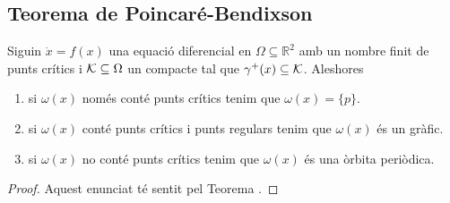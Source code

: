 \documentclass[../Apunts.tex]{subfiles}
\begin{document}
	\subsection{Teorema de Poincaré-Bendixson}
	\begin{definition}[Gràfic]
		\label{def:gràfic}
	\end{definition}
	\begin{theorem}
		\label{thm:Teorema de Poincaré-Bendixson}
		Siguin \(\dot{x}=f(x)\) una equació diferencial en \(\Omega\subseteq\mathbb{R}^{2}\) amb un nombre finit de punts crítics i \(\mathcal{K}\subseteq\Omega\) un compacte tal que \(\gamma^{+}(x)\subseteq\mathcal{K}\). Aleshores
		\begin{enumerate}
			\item\label{enum1:thm:Teorema de Poincaré-Bendixson} si \(\omega(x)\) només conté punts crítics tenim que \(\omega(x)=\{p\}\).
			\item\label{enum2:thm:Teorema de Poincaré-Bendixson} si \(\omega(x)\) conté punts crítics i punts regulars tenim que \(\omega(x)\) és un gràfic.
			\item\label{enum3:thm:Teorema de Poincaré-Bendixson} si \(\omega(x)\) no conté punts crítics tenim que \(\omega(x)\) és una òrbita periòdica.
		\end{enumerate}
		\begin{proof}
			Aquest enunciat té sentit pel Teorema . %
		\end{proof}
	\end{theorem}
	
\end{document}
